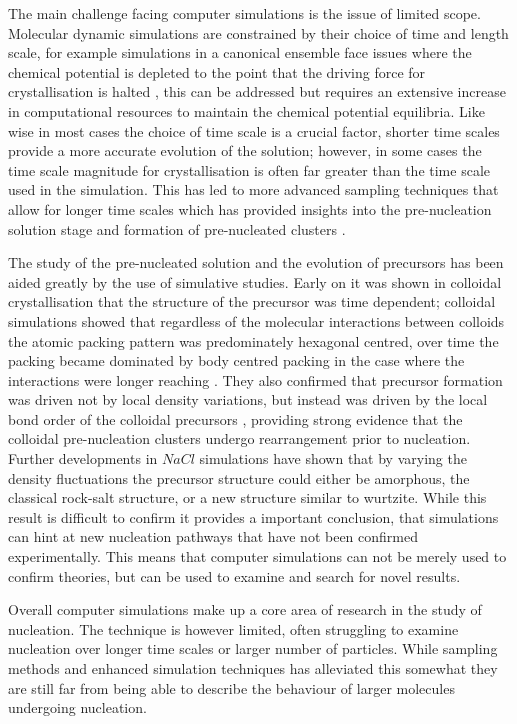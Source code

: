 The main challenge facing computer simulations is the issue
of limited scope. Molecular dynamic simulations are constrained
by their choice of time and length scale, for example simulations
in a canonical ensemble face issues where the chemical potential
is depleted to the point that the driving force for crystallisation
is halted \cite{DuranOlivencia2015, Finney2023}, this can be 
addressed but requires an extensive increase in computational 
resources to maintain the chemical potential equilibria. Like wise
in most cases the choice of time scale is a crucial factor, shorter
time scales provide a more accurate evolution of the solution; 
however, in some cases the time scale magnitude for crystallisation
is often far greater than the time scale used in the simulation. This
has led to more advanced sampling techniques that allow for longer 
time scales which has provided insights into the pre-nucleation 
solution stage and formation of pre-nucleated clusters \cite{Finney2023}.

The study of the pre-nucleated solution and the evolution of 
precursors has been aided greatly by the use of simulative 
studies. Early on it was shown in colloidal crystallisation 
that the structure of the precursor was time dependent; 
colloidal simulations showed that regardless of the molecular
interactions between colloids the atomic packing pattern was 
predominately hexagonal centred, over time the packing
became dominated by body centred packing in the case 
where the interactions were longer reaching \cite{Tan2013}. 
They also confirmed that precursor formation was driven not
by local density variations, but instead was driven by the 
local bond order of the colloidal precursors \cite{Tan2013}, 
providing strong evidence that the colloidal pre-nucleation 
clusters undergo rearrangement prior to nucleation. Further
developments in $NaCl$ simulations have shown that by varying
the density fluctuations the precursor structure could either
be amorphous, the classical rock-salt structure, or a new 
structure similar to wurtzite. While this result is difficult
to confirm it provides a important conclusion, that simulations
can hint at new nucleation pathways that have not been confirmed
experimentally. This means that computer simulations can not
be merely used to confirm theories, but can be used to examine
and search for novel results. 

Overall computer simulations make up a core area of research 
in the study of nucleation. The technique is however limited,
often struggling to examine nucleation over longer time scales
or larger number of particles. While sampling methods and 
enhanced simulation techniques has alleviated this somewhat 
they are still far from being able to describe the behaviour 
of larger molecules undergoing nucleation. 


